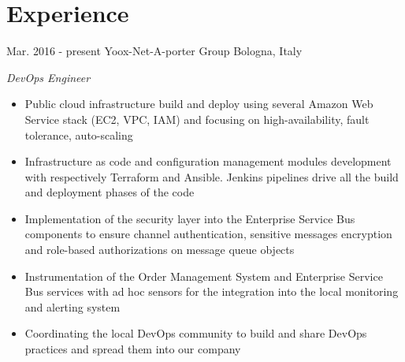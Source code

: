\documentclass[]{friggeri-cv} %
\begin{document}

\section{Experience}
\begin{entrylist}
\entry
{Mar. 2016 - present}
{ Yoox-Net-A-porter Group}
{Bologna, Italy}
{\emph{DevOps Engineer}
\begin{itemize}
\item {Public cloud infrastructure build and deploy using several Amazon Web Service stack (EC2, VPC, IAM) and focusing on high-availability, fault tolerance, auto-scaling}
\item {Infrastructure as code and configuration management modules development with respectively Terraform and Ansible. Jenkins pipelines drive all the build and deployment phases of the code}
\item {Implementation of the security layer into the Enterprise Service Bus components to ensure channel authentication, sensitive messages encryption and role-based authorizations on message queue objects}
\item {Instrumentation of the Order Management System and Enterprise Service Bus services with ad hoc sensors for the integration into the local monitoring and alerting system}
\item {Coordinating the local DevOps community to build and share DevOps practices and spread them into our company}
\end{itemize}}
\end{entrylist}
\end{document}
